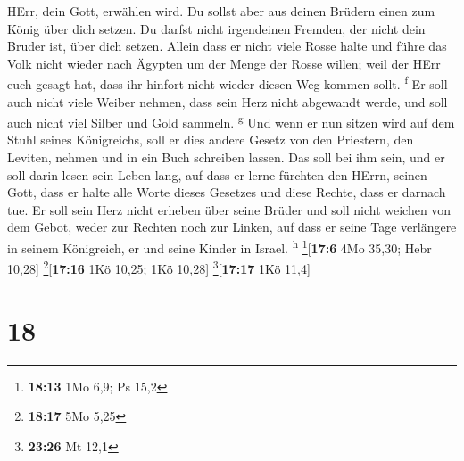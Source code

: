 HErr, dein Gott, erwählen wird. Du sollst aber aus deinen Brüdern einen
zum König über dich setzen. Du darfst nicht irgendeinen Fremden, der
nicht dein Bruder ist, über dich setzen.  Allein dass er
nicht viele Rosse halte und führe das Volk nicht wieder nach Ägypten um
der Menge der Rosse willen; weil der HErr euch gesagt hat, dass ihr
hinfort nicht wieder diesen Weg kommen sollt. \textsuperscript{f}
 Er soll auch nicht viele Weiber nehmen, dass sein Herz
nicht abgewandt werde, und soll auch nicht viel Silber und Gold sammeln.
\textsuperscript{g}  Und wenn er nun sitzen wird auf dem
Stuhl seines Königreichs, soll er dies andere Gesetz von den Priestern,
den Leviten, nehmen und in ein Buch schreiben lassen. 
Das soll bei ihm sein, und er soll darin lesen sein Leben lang, auf dass
er lerne fürchten den HErrn, seinen Gott, dass er halte alle Worte
dieses Gesetzes und diese Rechte, dass er darnach tue. 
Er soll sein Herz nicht erheben über seine Brüder und soll nicht weichen
von dem Gebot, weder zur Rechten noch zur Linken, auf dass er seine Tage
verlängere in seinem Königreich, er und seine Kinder in Israel.
\textsuperscript{h} \footnote{\textbf{18:13} 1Mo 6,9; Ps 15,2}{[}\textbf{17:6}
4Mo 35,30; Hebr 10,28{]} \footnote{\textbf{18:17} 5Mo 5,25}{[}\textbf{17:16}
1Kö 10,25; 1Kö 10,28{]} \footnote{\textbf{23:26} Mt 12,1}{[}\textbf{17:17}
1Kö 11,4{]}

\hypertarget{section-17}{%
\section{18}\label{section-17}}

